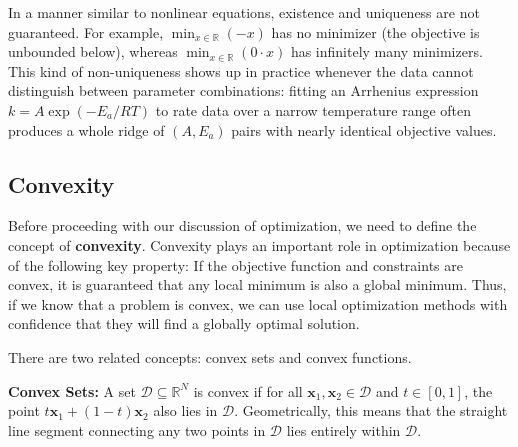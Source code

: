 In a manner similar to nonlinear equations, existence and uniqueness are not guaranteed. For example, $\min_{x \in \mathbb{R}} (-x)$ has no minimizer (the objective is unbounded below), whereas $\min_{x \in \mathbb{R}} (0\cdot x)$ has infinitely many minimizers. This kind of non-uniqueness shows up in practice whenever the data cannot distinguish between parameter combinations: fitting an Arrhenius expression $k=A\exp(-E_a/RT)$ to rate data over a narrow temperature range often produces a whole ridge of $(A,E_a)$ pairs with nearly identical objective values.

\subsection{Convexity}
\label{sec:convexity}
Before proceeding with our discussion of optimization, we need to define the concept of \textbf{convexity}.
Convexity plays an important role in optimization because of the following key property:
If the objective function and constraints are convex, it is guaranteed that any local minimum is also a global minimum.
Thus, if we know that a problem is convex, we can use local optimization methods with confidence that they will find a globally optimal solution.

There are two related concepts: convex sets and convex functions.

\textbf{Convex Sets:}
A set $\mathcal{D} \subseteq \mathbb{R}^N$ is convex if for all $\mathbf{x}_1,\mathbf{x}_2 \in \mathcal{D}$ and $t\in[0,1]$, the point $t \mathbf{x}_1 + (1-t) \mathbf{x}_2$ also lies in $\mathcal{D}$. Geometrically, this means that the straight line segment connecting any two points in $\mathcal{D}$ lies entirely within $\mathcal{D}$.

